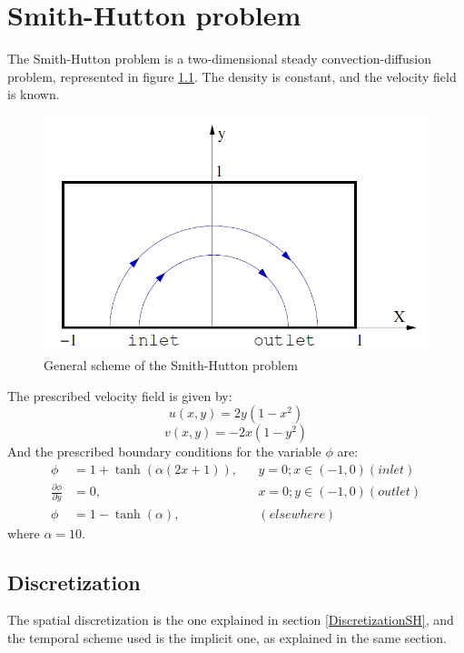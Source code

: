 \chapter{Smith-Hutton problem}
The Smith-Hutton problem is a two-dimensional steady convection-diffusion problem, represented in figure \ref{SHscheme}. The density is constant, and the velocity field is known.
\begin{figure}[h!]
	\centering
	\includegraphics[scale=0.65]{SmithHutton/SmithHutton}
	\caption{General scheme of the Smith-Hutton problem}
	\label{SHscheme}
\end{figure}

The prescribed velocity field is given by:
\begin{equation}
u\left(x,y\right)=2y\left(1-x^{2}\right)
\end{equation}
\begin{equation}
v\left(x,y\right)=-2x\left(1-y^{2}\right)
\end{equation}
And the prescribed boundary conditions for the variable $\phi$ are:
\begin{equation}
\begin{aligned}
\phi &=1+\tanh\left(\alpha\left(2x+1\right)\right),&&y=0; x\in\left(-1,0\right) \left(inlet\right) \\
\frac{\partial\phi}{\partial y} &=0,&&x=0; y\in\left(-1,0\right) \left(outlet\right) \\
\phi &=1-\tanh\left(\alpha\right),&&\left(elsewhere\right)
\end{aligned}
\label{BoundCond}
\end{equation}
where $\alpha=10$.

\section{Discretization}
The spatial discretization is the one explained in section \ref{DiscretizationSH}, and the temporal scheme used is the implicit one, as explained in the same section.

